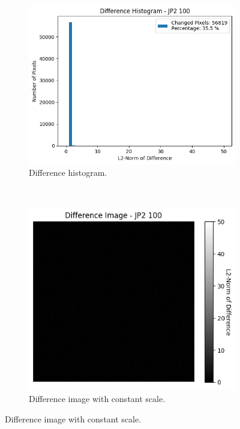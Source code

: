 \begin{figure}[htb]
\begin{subfigure}[b]{0.48\textwidth}
        \includegraphics[width=\textwidth]{doc/thesis/0_figures/compare_quality/set1/jp2_100_center_diff_histogram.png}
        \caption{Difference histogram.}
        \label{fig:img_quality_comp_jp2_100_center_histo}
    \end{subfigure}
    \\
    \begin{subfigure}[b]{0.48\textwidth}
        \centering
        \includegraphics[width=\textwidth]{doc/thesis/0_figures/compare_quality/set1/jp2_100_center_diff_heatmap.png}
        \caption{Difference image with constant scale.}

\end{subfigure}
\end{figure}
